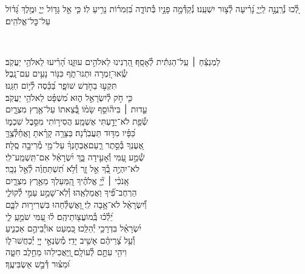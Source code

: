 \documentclass[twoside, openany, parskip=half, 11pt]{book}
\begin{document}
{\begin{narrow}
לְ֭֯כוּ נְ֯רַֽנֲנָ֣ה לַֽיְיָ֑ נָ֝רִ֗יעָה לְ֯צ֣וּר יִשְׁעֵֽנוּ׃ נְ֯קַדְּ֯מָ֣ה פָנָ֣יו בְּ֯תוֹדָ֑ה בִּ֝זְמִר֗וֹת נָרִ֥יעַ לֽוֹ׃ כִּ֤י אֵ֣ל גָּד֣וֹל יְיָ֑ וּמֶ֥לֶךְ גָּ֝ד֗וֹל עַל־כׇּל־אֱלֹהִֽים׃
\end{narrow}

\\
\vspace{-1.5\baselineskip}
\begin{narrow}
%
לַמְנַצֵּ֬חַ ׀ עַֽל־הַגִּתִּ֬ית לְ֯אָסָֽף׃ \hfill \break
הַ֭רְנִינוּ לֵאלֹהִ֣ים עוּזֵּ֑נוּ \hfill הָ֝רִ֗יעוּ לֵאלֹהֵ֥י יַעֲקֹֽב׃ \\
שְֽׂ֯אוּ־זִ֭מְרָה וּתְנוּ־תֹ֑ף \hfill כִּנּ֖וֹר נָעִ֣ים עִם־נָֽבֶל׃ \\
תִּקְע֣וּ בַחֹ֣דֶשׁ שׁוֹפָ֑ר \hfill בַּ֝כֵּ֗סֶה לְ֯י֣וֹם חַגֵּֽנוּ׃ \\
כִּ֤י חֹ֣ק לְ֯יִשְׂרָאֵ֣ל ה֑וּא \hfill מִ֝שְׁפָּ֗ט לֵאלֹהֵ֥י יַעֲקֹֽב׃ \\
עֵ֤דוּת ׀ בִּיה֘וֹסֵ֤ף שָׂמ֗וֹ \hfill בְּ֭֯צֵאתוֹ עַל־אֶ֣רֶץ מִצְרָ֑יִם \\ שְׂ֯פַ֖ת לֹא־יָדַ֣עְתִּי אֶשְׁמָֽע׃ \hfill
הֲסִיר֣וֹתִי מִסֵּ֣בֶל שִׁכְמ֑וֹ \\ כַּ֝פָּ֗יו מִדּ֥וּד תַּעֲבֹֽרְ֯נָה׃ \hfill
בַּצָּרָ֥ה קָרָ֗אתָ וָאֲחַ֫לְּ֯צֶ֥ךָּ \\ אֶ֭עֶנְךָ בְּ֯סֵ֣תֶר רַ֑עַם\hfill אֶבְחׇנְךָ֨ עַל־מֵ֖י מְ֯רִיבָ֣ה סֶֽלָה׃ \\
שְׁ֯מַ֣ע עַ֭מִּי וְ֯אָעִ֣ידָה בָּ֑ךְ \hfill יִ֝שְׂרָאֵ֗ל אִם־תִּֽשְׁמַֽע־לִֽי׃ \\
לֹא־יִהְיֶ֣ה בְ֭֯ךָ אֵ֣ל זָ֑ר \hfill וְ֯לֹ֥א תִ֝שְׁתַּחֲוֶ֗ה לְ֯אֵ֣ל נֵכָֽר׃ \\
אָֽנֹכִ֨י ׀ יְ֘יָ֤ אֱלֹהֶ֗יךָ \hfill הַֽ֭מַּעַלְךָ מֵאֶ֣רֶץ מִצְרָ֑יִם \\ הַרְחֶב־פִּ֗֝יךָ וַאֲמַלְאֵֽהוּ׃ \hfill
וְ֯לֹֽא־שָׁמַ֣ע עַמִּ֣י לְ֯קוֹלִ֑י \\ וְ֯֝יִשְׂרָאֵ֗ל לֹא־אָ֥בָה לִֽי׃ \hfill
וָ֭אֲשַׁלְּ֯חֵהוּ בִּשְׁרִיר֣וּת לִבָּ֑ם \\ יֵ֝לְ֯כ֗וּ בְּֽ֯מוֹעֲצ֖וֹתֵיהֶֽם׃ \hfill
ל֗וּ עַ֭מִּי שֹׁמֵ֣עַֽ לִ֑י \\ יִ֝שְׂרָאֵ֗ל בִּדְרָכַ֥י יְ֯הַלֵּֽכוּ׃ \hfill
כִּ֭מְעַט אוֹיְ֯בֵיהֶ֣ם אַכְנִ֑יעַ \\ וְ֯עַ֥ל צָ֝רֵיהֶ֗ם אָשִׁ֥יב יָדִֽי׃ \hfill
מְ֯שַׂנְאֵ֣י יְיָ֭ יְ֯כַחֲשׁוּ־ל֑וֹ \\ וִיהִ֖י עִתָּ֣ם לְ֯עוֹלָֽם׃ \hfill
וַֽ֭יַּאֲכִילֵהוּ מֵחֵ֣לֶב חִטָּ֑ה \\ וּ֝מִצּ֗וּר דְּ֯בַ֣שׁ אַשְׂבִּיעֶֽךָ׃ \hfill \break
\end{narrow}

}
\end{document}
